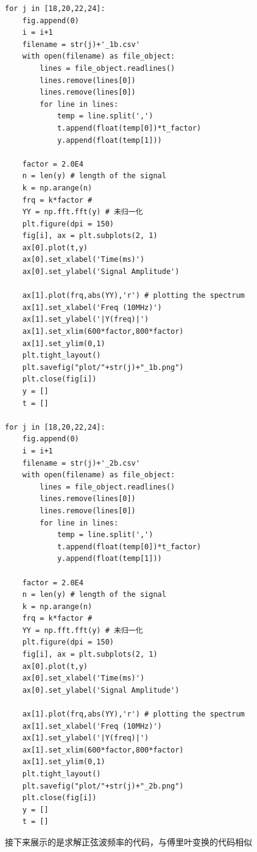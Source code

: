 \documentclass{ctexart}
\begin{document}
\begin{lstlisting}
for j in [18,20,22,24]:
    fig.append(0)
    i = i+1
    filename = str(j)+'_1b.csv'
    with open(filename) as file_object:
        lines = file_object.readlines()
        lines.remove(lines[0])
        lines.remove(lines[0])
        for line in lines:
            temp = line.split(',')
            t.append(float(temp[0])*t_factor)
            y.append(float(temp[1]))
        
    factor = 2.0E4
    n = len(y) # length of the signal
    k = np.arange(n)
    frq = k*factor #
    YY = np.fft.fft(y) # 未归一化
    plt.figure(dpi = 150)
    fig[i], ax = plt.subplots(2, 1)
    ax[0].plot(t,y)
    ax[0].set_xlabel('Time(ms)')
    ax[0].set_ylabel('Signal Amplitude')
    
    ax[1].plot(frq,abs(YY),'r') # plotting the spectrum
    ax[1].set_xlabel('Freq (10MHz)')
    ax[1].set_ylabel('|Y(freq)|')
    ax[1].set_xlim(600*factor,800*factor)
    ax[1].set_ylim(0,1)
    plt.tight_layout()
    plt.savefig("plot/"+str(j)+"_1b.png")
    plt.close(fig[i])
    y = []
    t = []

for j in [18,20,22,24]:
    fig.append(0)
    i = i+1
    filename = str(j)+'_2b.csv'
    with open(filename) as file_object:
        lines = file_object.readlines()
        lines.remove(lines[0])
        lines.remove(lines[0])
        for line in lines:
            temp = line.split(',')
            t.append(float(temp[0])*t_factor)
            y.append(float(temp[1]))
        
    factor = 2.0E4
    n = len(y) # length of the signal
    k = np.arange(n)
    frq = k*factor #
    YY = np.fft.fft(y) # 未归一化
    plt.figure(dpi = 150)
    fig[i], ax = plt.subplots(2, 1)
    ax[0].plot(t,y)
    ax[0].set_xlabel('Time(ms)')
    ax[0].set_ylabel('Signal Amplitude')
    
    ax[1].plot(frq,abs(YY),'r') # plotting the spectrum
    ax[1].set_xlabel('Freq (10MHz)')
    ax[1].set_ylabel('|Y(freq)|')
    ax[1].set_xlim(600*factor,800*factor)
    ax[1].set_ylim(0,1)
    plt.tight_layout()
    plt.savefig("plot/"+str(j)+"_2b.png")
    plt.close(fig[i])
    y = []
    t = []
 \end{lstlisting}
接下来展示的是求解正弦波频率的代码，与傅里叶变换的代码相似
\end{document}
